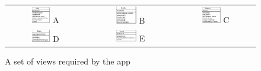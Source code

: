 \documentclass[a4paper, 11pt, titlepage]{article}
\begin{document}
\begin{figure}[H]
	\centering
	\begin{tabular}{ccc}
	\includegraphics[width=0.25\textwidth]{figures/object-models/AppDiary.pdf} A & \includegraphics[width=0.25\textwidth]{figures/object-models/AppGoals.pdf} B & \includegraphics[width=0.25\textwidth]{figures/object-models/AppSchedule.pdf} C \\
	\includegraphics[width=0.25\textwidth]{figures/object-models/AppStats.pdf} D & \includegraphics[width=0.25\textwidth]{figures/object-models/AppSurvey.pdf} E
	\end{tabular}
	\caption{A set of views required by the app}
\end{figure}

\newpage
\end{document}
